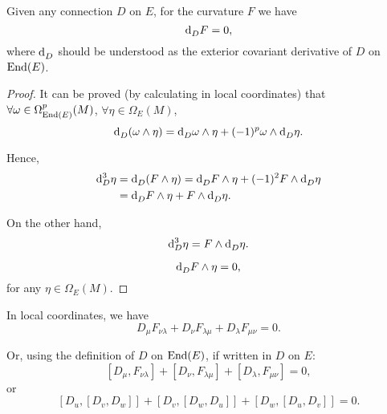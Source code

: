 \documentclass[openany, oneside, a5paper]{book}
\begin{document}
\begin{theorem}
    Given any connection $D$ on $E$, for the curvature $F$ we have
    \begin{equation}
        \dif_D F = 0,
    \end{equation}
    where $\dif_D$ should be understood as the exterior covariant derivative of $D$ on $\End(E)$.
\end{theorem}
\begin{proof}
    It can be proved (by calculating in local coordinates) that $\forall \omega \in \Omega^p_{\End(E)}(M)$, $\forall \eta \in \Omega_E(M)$,
    \begin{equation}
        \dif_D (\omega \wedge \eta) = \dif_D \omega \wedge \eta + (-1)^p \omega \wedge \dif_D \eta.
    \end{equation}

    Hence, 
    \begin{align}
        \dif[3]_D \eta &= \dif_D (F \wedge \eta)
        = \dif_D F \wedge \eta + (-1)^2 F \wedge \dif_D \eta
        \\
        &= \dif_D F \wedge \eta + F \wedge \dif_D \eta.
    \end{align}
    
    On the other hand,
    \begin{equation}
        \dif[3]_D \eta = F \wedge \dif_D \eta.
    \end{equation}

    \hence
    \begin{equation}
        \dif_D F \wedge \eta = 0,
    \end{equation}
    for any $\eta \in \Omega_E(M)$.
\end{proof}

In local coordinates, we have
\begin{equation}
    D_\mu F_{\nu \lambda} + D_\nu F_{\lambda \mu} + D_\lambda F_{\mu \nu} = 0.
\end{equation}

Or, using the definition of $D$ on $\End(E)$, if written in $D$ on $E$:
\begin{equation}\label{eq: Bianchi identity (D and F, local coordinates)}
    [D_\mu, F_{\nu \lambda}] + [D_\nu, F_{\lambda \mu}] + [D_\lambda, F_{\mu \nu}] = 0,
\end{equation}
or
\begin{equation}\label{eq: Bianchi identity (D, local coordinates)}
    [D_u, [D_v, D_w]] + [D_v, [D_w, D_u]] + [D_w, [D_u, D_v]] = 0.
\end{equation}
\end{document}
